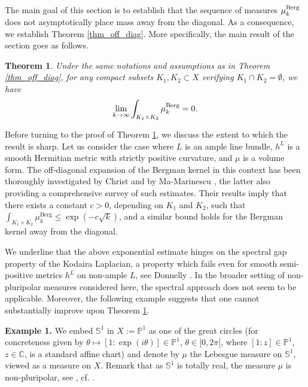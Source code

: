 \documentclass[12pt]{article}
\numberwithin{equation}{section}
\theoremstyle{theorem}
\newtheorem{thm}{Theorem}[section]
\theoremstyle{definition}
\theoremstyle{remark}
\newcommand{\comp}{\mathbb{C}}
\begin{document}
	The main goal of this section is to establish that the sequence of measures $\mu_k^{\rm{Berg}}$ does not asymptotically place mass away from the diagonal.
	As a consequence, we establish Theorem \ref{thm_off_diag}.
	More specifically, the main result of the section goes as follows.
	\begin{thm}\label{thm_nomass}
		Under the same notations and assumptions as in Theorem \ref{thm_off_diag}, for any compact subsets $K_1, K_2 \subset X$ verifying $K_1 \cap K_2 = \emptyset$, we have
		\begin{equation}
			\lim_{k \to \infty} \int_{K_1 \times K_2} \mu_k^{\rm{Berg}} = 0.
 		\end{equation}
	\end{thm}
	\par 
	Before turning to the proof of Theorem \ref{thm_nomass}, we discuss the extent to which the result is sharp.
	Let us consider the case where $L$ is an ample line bundle, $h^L$ is a smooth Hermitian metric with strictly positive curvature, and $\mu$ is a volume form.  
	The off-diagonal expansion of the Bergman kernel in this context has been thoroughly investigated by Christ \cite{ChristOffDiagDim1} and by Ma-Marinescu \cite{MaMarOffDiag}, the latter also providing a comprehensive survey of such estimates.
	Their results imply that there exists a constant $c > 0$, depending on $K_1$ and $K_2$, such that $\int_{K_1 \times K_2} \mu_k^{\mathrm{Berg}} \leq \exp(-c \sqrt{k})$, and a similar bound holds for the Bergman kernel away from the diagonal.
	\par 
	We underline that the above exponential estimate hinges on the spectral gap property of the Kodaira Laplacian, a property which fails even for smooth semi-positive metrics $h^L$ on non-ample $L$, see Donnelly \cite{DonnellyGap}. 
	In the broader setting of non-pluripolar measures considered here, the spectral approach does not seem to be applicable.
	Moreover, the following example suggests that one cannot substantially improve upon Theorem \ref{thm_nomass}.
	\par 
	\textbf{Example 1.}
	We embed $\mathbb{S}^1$ in $X := \mathbb{P}^1$ as one of the great circles (for concreteness given by $\theta \mapsto [1: \exp(i \theta)] \in \mathbb{P}^1$, $\theta \in [0, 2 \pi[$, where $[1 : z] \in \mathbb{P}^1$, $z \in \comp$, is a standard affine chart) and denote by $\mu$ the Lebesgue measure on $\mathbb{S}^1$, viewed as a measure on $X$.
	Remark that as $\mathbb{S}^1$ is totally real, the measure $\mu$ is non-pluripolar, see \cite{SadullaevReal}, cf. \cite[Exercise 4.39.5]{GuedjZeriahBook}. 
\end{document}
